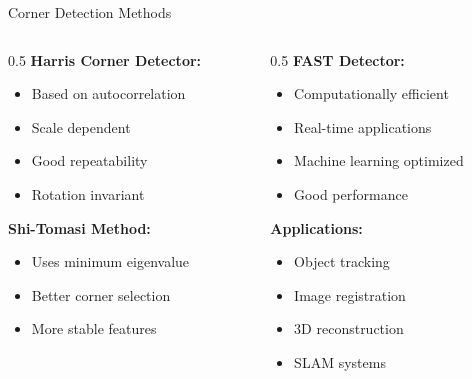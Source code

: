 \documentclass[aspectratio=169,10pt]{beamer}
\begin{document}
\begin{frame}{Corner Detection Methods}
    \begin{columns}[c]
        \begin{column}{0.5\textwidth}
            \textbf{Harris Corner Detector:}
            \begin{itemize}
                \item Based on autocorrelation
                \item Scale dependent
                \item Good repeatability
                \item Rotation invariant
            \end{itemize}

            \textbf{Shi-Tomasi Method:}
            \begin{itemize}
                \item Uses minimum eigenvalue
                \item Better corner selection
                \item More stable features
            \end{itemize}
        \end{column}
        \begin{column}{0.5\textwidth}
            \textbf{FAST Detector:}
            \begin{itemize}
                \item Computationally efficient
                \item Real-time applications
                \item Machine learning optimized
                \item Good performance
            \end{itemize}

            \textbf{Applications:}
            \begin{itemize}
                \item Object tracking
                \item Image registration
                \item 3D reconstruction
                \item SLAM systems
            \end{itemize}
        \end{column}
    \end{columns}
\end{frame}

\end{document}
